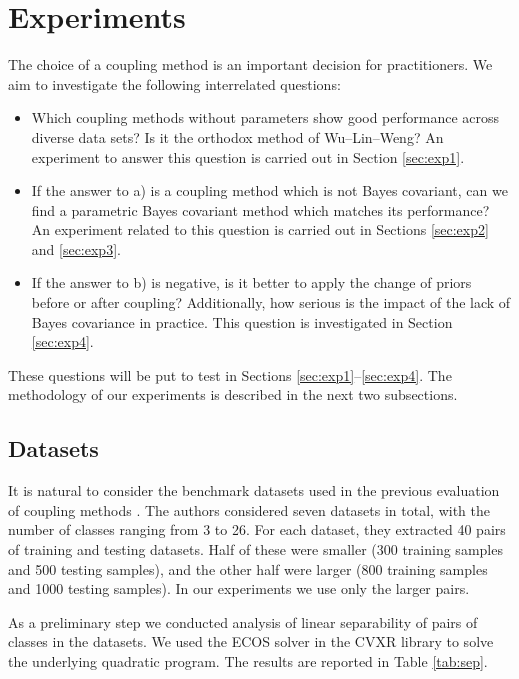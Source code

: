 \section{Experiments}

The choice of a coupling method is an important decision for practitioners. 
We aim to investigate the following interrelated questions:

\begin{itemize}
	\item[(a)] Which coupling methods without parameters show good performance across diverse data sets? Is it the orthodox method of Wu--Lin--Weng? An experiment to answer this question is carried out in Section \ref{sec:exp1}. 
	\item[(b)] If the answer to a) is a coupling method which is not Bayes covariant, can we find a parametric Bayes covariant method which  matches its performance? An experiment related to this question is carried out in  Sections \ref{sec:exp2} and \ref{sec:exp3}.
	\item[(c)] If the answer to b) is negative, is it better to apply the change of priors before or after coupling? Additionally, how serious is the impact of the lack of Bayes covariance in practice. This question is investigated in Section \ref{sec:exp4}.
\end{itemize}

These questions will be put to test in Sections \ref{sec:exp1}--\ref{sec:exp4}. 
The methodology of our experiments is described in the next two subsections.

\subsection{Datasets}

It is natural to consider the benchmark datasets used in the previous evaluation 
of coupling methods \cite{wu2004probability}. The authors considered seven datasets 
in total, with the number of classes ranging from 3 to 26. For each dataset, 
they extracted 40 pairs of training and testing datasets. Half of these were 
smaller (300 training samples and 500 testing samples), and the other half 
were larger (800 training samples and 1000 testing samples). In our experiments 
we use only the larger pairs. 

As a preliminary step we conducted analysis of linear separability of pairs of classes in the datasets. 
We used the ECOS solver in the CVXR library to solve the underlying quadratic program. The results are reported in Table \ref{tab:sep}.


